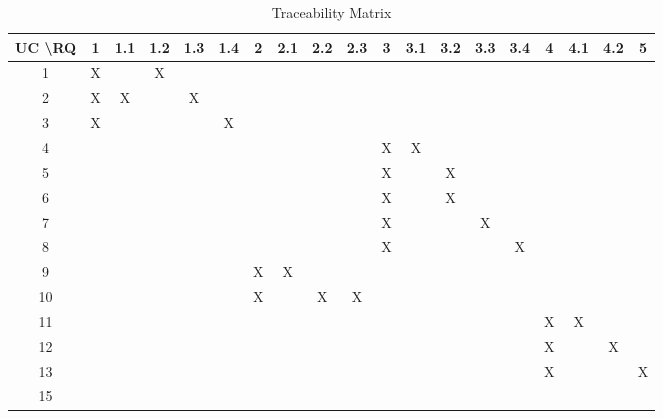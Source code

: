 
	\begin{table}[htp!]
		\centering
			\caption{Traceability Matrix}
			\label{my-label}
			 \hspace*{-2.5cm}
			 \begin{tabular}{|c|c|c|c|c|c|c|c|c|c|c|c|c|c|c|c|c|c|c|}
\hline
UC	\textbackslash{}RQ & 1 & 1.1 & 1.2 & 1.3 & 1.4 & 2 & 2.1 & 2.2 & 2.3 & 3 & 3.1 & 3.2 & 3.3 & 3.4 & 4 & 4.1 & 4.2 & 5 \\ \hline
1     & X &     & X   &     &     &   &     &     &     &   &     &     &     &     &   &     &     &   \\ \hline
2     & X & X   &     & X   &     &   &     &     &     &   &     &     &     &     &   &     &     &   \\ \hline
3     & X &     &     &     & X   &   &     &     &     &   &     &     &     &     &   &     &     &   \\ \hline
4     &   &     &     &     &     &   &     &     &     & X & X   &     &     &     &   &     &     &   \\ \hline
5     &   &     &     &     &     &   &     &     &     & X &     & X   &     &     &   &     &     &   \\ \hline
6     &   &     &     &     &     &   &     &     &     & X &     & X   &     &     &   &     &     &   \\ \hline
7     &   &     &     &     &     &   &     &     &     & X &     &     & X   &     &   &     &     &   \\ \hline
8     &   &     &     &     &     &   &     &     &     & X &     &     &     & X   &   &     &     &   \\ \hline
9     &   &     &     &     &     & X & X   &     &     &   &     &     &     &     &   &     &     &   \\ \hline
10    &   &     &     &     &     & X &     & X   & X   &   &     &     &     &     &   &     &     &   \\ \hline
11    &   &     &     &     &     &   &     &     &     &   &     &     &     &     & X & X   &     &   \\ \hline
12    &   &     &     &     &     &   &     &     &     &   &     &     &     &     & X &     & X   &   \\ \hline
13    &   &     &     &     &     &   &     &     &     &   &     &     &     &     & X &     &     & X \\ \hline
15    &   &     &     &     &     &   &     &     &     &   &     &     &     &     &   &     &     &   \\ \hline
			\end{tabular}
	\end{table}
	
	